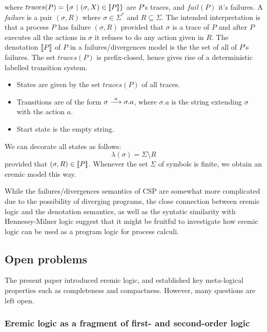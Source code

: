 where $traces(P) = \{ \sigma\ |\ (\sigma, X) \in \lbrack\!\lbrack P \rbrack\!\rbrack \}$ are
$P$'s traces, and $fail(P)$ it's failures.  A \emph{failure} is a pair
$(\sigma, R)$ where $\sigma \in \Sigma^*$ and $R \subseteq
\Sigma$. The intended interpretation is that a process $P$ has failure
$(\sigma, R)$ provided that $\sigma$ is a trace of $P$ and after $P$
executes all the actions in $\sigma$ it refuses to do any action given
in $R$. The denotation $\lbrack\!\lbrack P \rbrack\!\rbrack$ of $P$ in a failures/divergences
model is the the set of all of $P$'s failures. The set $ traces(P)$ is
prefix-closed, hence gives rise of a deterministic labelled transition
system.
\begin{itemize}

\item States are given by the set $traces(P)$ of all traces.

\item Transitions are of the form $\sigma \stackrel{a}{\longrightarrow} \sigma.a$, where
  $\sigma.a$ is the string extending $\sigma$ with the action $a$.

\item Start state is the empty string.

\end{itemize}
We can decorate all states as follows:
\[
   \lambda (\sigma) = \Sigma \setminus R
\]
provided that $(\sigma, R) \in \lbrack\!\lbrack P \rbrack\!\rbrack$.  Whenever the set $\Sigma$
of symbols is finite, we obtain an eremic model this way.

While the failures/divergences semantics of CSP are somewhat more
complicated due to the possibility of diverging programs, the close
connection between eremic logic and the denotation semantics, as well
as the syntatic similarity with Hennessy-Milner logic suggest that it
might be fruitful to investigate how eremic logic can be used as a
program logic for process calculi.

\subsection{Open problems} 

The present paper introduced eremic logic, and established key
meta-logical properties such as completeness and compactness. However,
many questions are left open. 

\subsubsection{Eremic logic as a fragment of first- and second-order logic }

